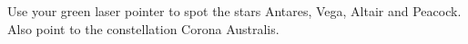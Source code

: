 Use your green laser pointer to spot the stars Antares, Vega, Altair and
Peacock. Also point to the constellation Corona Australis.
